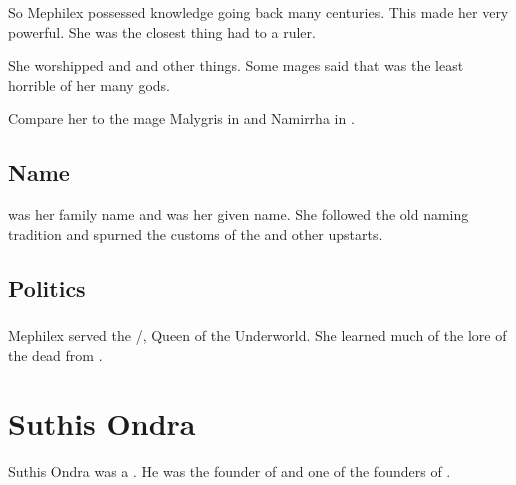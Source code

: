 So Mephilex possessed knowledge going back many centuries. 
This made her very powerful. 
She was the closest thing \Yormis had to a ruler. 

She worshipped \Ubloth and \Thessulax and other things. 
Some mages said that \Ubloth was the least horrible of her many gods. 

Compare her to the mage Malygris in \cite{ClarkAshtonSmith:TheDeathofMalygris} and Namirrha in \cite{ClarkAshtonSmith:TheDarkEidolon}. 









\subsection{Name}
 was her family name and  was her given name. 
She followed the old \Ortaican naming tradition and spurned the customs of the \Tepharites and other upstarts. 









\subsection{Politics}





\subsubsection{\Thessulax}
Mephilex served the \dragon/\taortha \Thessulax, Queen of the Underworld. 
She learned much of the lore of the dead from \Thessulax. 















\section{Suthis Ondra}
Suthis Ondra was a \rethyax \scatha. 
He was the founder of  and one of the founders of \Ortaica. 

